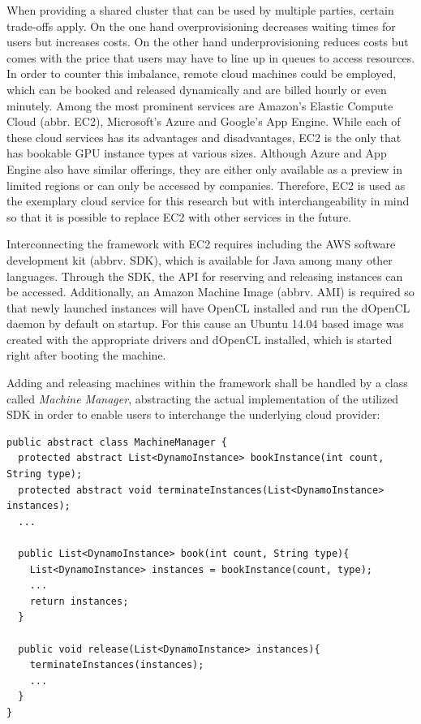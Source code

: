 When providing a shared cluster that can be used by multiple parties, certain trade-offs apply. On the one hand overprovisioning decreases waiting times for users but increases costs. On the other hand underprovisioning reduces costs but comes with the price that users may have to line up in queues to access resources. In order to counter this imbalance, remote cloud machines could be employed, which can be booked and released dynamically and are billed hourly or even minutely. Among the most prominent services are Amazon's Elastic Compute Cloud (abbr. EC2), Microsoft's Azure and Google's App Engine. While each of these cloud services has its advantages and disadvantages, EC2 is the only that has bookable GPU instance types at various sizes. Although Azure and App Engine also have similar offerings, they are either only available as a preview in limited regions or can only be accessed by companies. Therefore, EC2 is used as the exemplary cloud service for this research but with interchangeability in mind so that it is possible to replace EC2 with other services in the future.

Interconnecting the framework with EC2 requires including the AWS software development kit (abbrv. SDK), which is available for Java among many other languages. Through the SDK, the API for reserving and releasing instances can be accessed. Additionally, an Amazon Machine Image (abbrv. AMI) is required so that newly launched instances will have OpenCL installed and run the dOpenCL daemon by default on startup. For this cause an Ubuntu 14.04 based image was created with the appropriate drivers and dOpenCL installed, which is started right after booting the machine.

Adding and releasing machines within the framework shall be handled by a class called \textit{Machine Manager}, abstracting the actual implementation of the utilized SDK in order to enable users to interchange the underlying cloud provider:


\begin{lstlisting}
public abstract class MachineManager {
  protected abstract List<DynamoInstance> bookInstance(int count, String type);
  protected abstract void terminateInstances(List<DynamoInstance> instances);
  ...

  public List<DynamoInstance> book(int count, String type){
    List<DynamoInstance> instances = bookInstance(count, type);
    ...
    return instances;
  }

  public void release(List<DynamoInstance> instances){
    terminateInstances(instances);
    ...
  }
}
\end{lstlisting}


